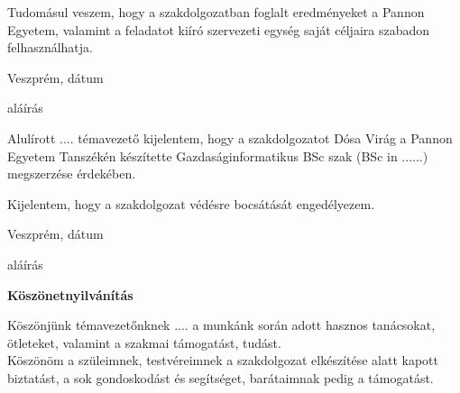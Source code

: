 	Tudomásul veszem, hogy a szakdolgozatban foglalt eredményeket a Pannon Egyetem, valamint a feladatot kiíró szervezeti egység saját céljaira szabadon felhasználhatja.
	
	\vspace{1cm}
	\noindent
	Veszprém, dátum
	
	\vspace{1cm}
	\noindent
	\hspace{11 cm}aláírás
	\vspace{3,5cm}
	
	
	Alulírott .... témavezető kijelentem, hogy a szakdolgozatot Dósa Virág a Pannon Egyetem Tanszékén készítette Gazdaságinformatikus BSc szak (BSc in ......) megszerzése érdekében.
	
	Kijelentem, hogy a szakdolgozat védésre bocsátását engedélyezem.
	
	\vspace{1cm}
	\noindent
	Veszprém, dátum
	
	\vspace{1cm}
	\noindent
	\hspace{11 cm}aláírás
	
	\newpage
	\pagestyle{plain}
	\begin{center}
		\Large
		\textbf{Köszönetnyilvánítás}
	\end{center}
	
	\normalsize
	Köszönjünk témavezetőnknek .... a munkánk során adott hasznos tanácsokat, ötleteket, valamint a szakmai támogatást, tudást.
	\\
	
	Köszönöm a szüleimnek, testvéreimnek a szakdolgozat elkészítése alatt kapott biztatást, a sok gondoskodást és segítséget, barátaimnak pedig a támogatást.
	\\